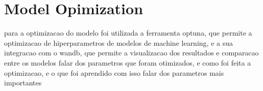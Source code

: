 \section{Model Opimization}
para a optimizacao do modelo foi utilizada a ferramenta optuna, que permite a optimizacao de hiperparametros de modelos de machine learning, e a sua integracao com o wandb, que permite a visualizacao dos resultados e comparacao entre os modelos
falar dos parametros que foram otimizados, e como foi feita a optimizacao, e o que foi aprendido com isso
falar dos parametros mais importantes




